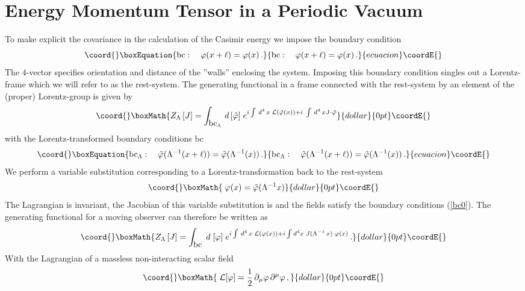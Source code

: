\documentclass[a4paper,twocolumn,eqsecnum,aps]{revtex4}
\begin{document}
\section{Energy Momentum Tensor in a Periodic Vacuum}
To make explicit  the covariance in the calculation of the Casimir energy we impose the boundary condition  
\begin{equation}\coord{}\boxEquation{
  \label{bc0}
  \mbox{bc}:\quad \varphi (x+\ell) = \varphi (x) \, .
}{
  \mbox{bc}:\quad \varphi (x+\ell) = \varphi (x) \, .
}{ecuacion}\coordE{}\end{equation}
The 4-vector \myHighlight{$\ell$}\coordHE{} specifies orientation and distance of the ''walls'' enclosing the system. Imposing this boundary condition singles out a Lorentz-frame which we will refer to as the rest-system.  
The generating  functional in a frame 
connected with the rest-system by an element \myHighlight{$\Lambda$}\coordHE{} of the (proper) Lorentz-group is given by
$$\coord{}\boxMath{
Z _{\Lambda}\, [J] = \int_{\mbox{bc}_{\Lambda}} \, d \, [\tilde{\varphi}]  \; e^{i \int \, d^{4}\, x \; {\cal L} (\tilde{\varphi} (x)) + i \; \int \, d^{4}\, x J \cdot \tilde{\varphi}}
}{dollar}{0pt}\coordE{}$$
with the  Lorentz-transformed boundary conditions  bc\myHighlight{$_{\Lambda}$}\coordHE{} 
\begin{equation}\coord{}\boxEquation{
  \label{bc1}
\mbox{bc}_{\Lambda}:\quad \tilde{\varphi} (\Lambda ^{-1}(x + \ell) ) = 
 \tilde{\varphi} (\Lambda^{-1} (x )) \,.
}{
  \mbox{bc}_{\Lambda}:\quad \tilde{\varphi} (\Lambda ^{-1}(x + \ell) ) = 
 \tilde{\varphi} (\Lambda^{-1} (x )) \,.
}{ecuacion}\coordE{}\end{equation}
We perform a variable substitution  corresponding to a 
Lorentz-transformation   back to the rest-system
$$\coord{}\boxMath{ \; \varphi(x) = \tilde{\varphi} (\Lambda^{-1} x)}{dollar}{0pt}\coordE{}$$
The Lagrangian  \coordHE{} is invariant, the Jacobian of this variable substitution is \coordHE{} and the 
fields \myHighlight{$\varphi$}\coordHE{} satisfy the boun\-dary conditions (\ref{bc0}).
The generating functional for a  moving observer can therefore be written as 
$$\coord{}\boxMath{
Z _{\Lambda}\, [J] = \int_{\mbox{bc}} \; d \; [ \varphi ] \; e^{i \int \, d^{4}\, x \; 
{\cal L} (\varphi(x)) + i \int d^{4} x \; J (\Lambda^{-1} \,x) \; \varphi (x)} \, .}{dollar}{0pt}\coordE{}$$
With the Lagrangian of a massless non-interacting scalar field
$$\coord{}\boxMath{ \; {\cal L}[\varphi] =  \frac{1}{2}\,\partial _{\mu} \varphi \, \partial ^{\mu} \varphi \,,}{dollar}{0pt}\coordE{}$$ 
\end{document}
